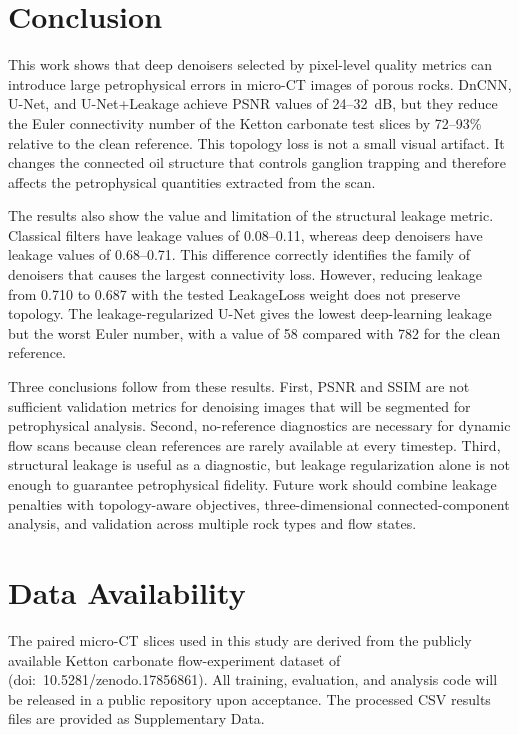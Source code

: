 \documentclass[review,12pt]{elsarticle}
\begin{document}
\section{Conclusion}
\label{sec:conclusion}

This work shows that deep denoisers selected by pixel-level quality
metrics can introduce large petrophysical errors in micro-CT images of
porous rocks.  DnCNN, U-Net, and U-Net+Leakage achieve PSNR values of
24--32~dB, but they reduce the Euler connectivity number of the Ketton
carbonate test slices by 72--93\% relative to the clean reference.  This
topology loss is not a small visual artifact.  It changes the connected
oil structure that controls ganglion trapping and therefore affects the
petrophysical quantities extracted from the scan.

The results also show the value and limitation of the structural
leakage metric.  Classical filters have leakage values of 0.08--0.11,
whereas deep denoisers have leakage values of 0.68--0.71.  This
difference correctly identifies the family of denoisers that causes the
largest connectivity loss.  However, reducing leakage from 0.710 to
0.687 with the tested LeakageLoss weight does not preserve topology.
The leakage-regularized U-Net gives the lowest deep-learning leakage
but the worst Euler number, with a value of 58 compared with 782 for
the clean reference.

Three conclusions follow from these results.  First, PSNR and SSIM are
not sufficient validation metrics for denoising images that will be
segmented for petrophysical analysis.  Second, no-reference diagnostics
are necessary for dynamic flow scans because clean references are rarely
available at every timestep.  Third, structural leakage is useful as a
diagnostic, but leakage regularization alone is not enough to guarantee
petrophysical fidelity.  Future work should combine leakage penalties
with topology-aware objectives, three-dimensional connected-component
analysis, and validation across multiple rock types and flow states.

\section*{Data Availability}
The paired micro-CT slices used in this study are derived from
the publicly available Ketton carbonate flow-experiment dataset
of~\cite{Ma2026zenodo} (doi:~10.5281/zenodo.17856861).
All training, evaluation, and analysis code will be released in a public
repository upon acceptance.  The processed CSV results files are
provided as Supplementary Data.
\end{document}
